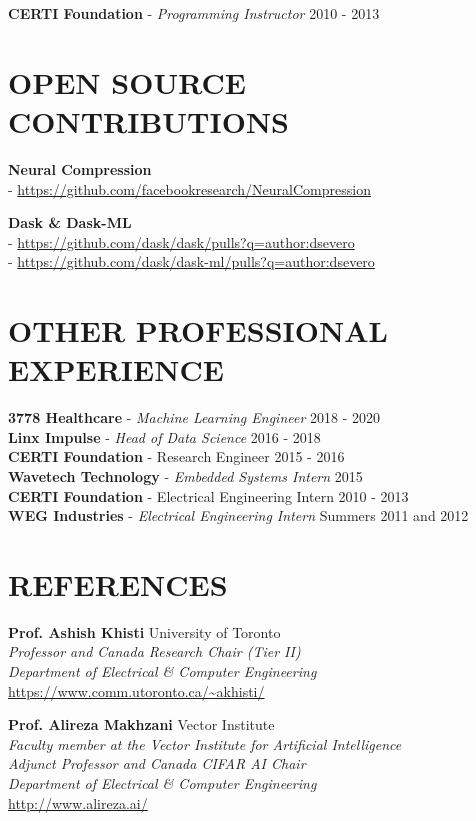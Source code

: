 \documentclass[margin, line]{res}
\begin{document}
\begin{resume}
\textbf{CERTI Foundation} - {\sl Programming Instructor} \hfill 2010 - 2013

\section{OPEN SOURCE CONTRIBUTIONS}
\textbf{Neural Compression}\\
- \url{https://github.com/facebookresearch/NeuralCompression}

\textbf{Dask \& Dask-ML}\\
- \url{https://github.com/dask/dask/pulls?q=author:dsevero}\\
- \url{https://github.com/dask/dask-ml/pulls?q=author:dsevero}

\section{OTHER PROFESSIONAL EXPERIENCE}
\textbf{3778 Healthcare} - {\sl Machine Learning Engineer} \hfill 2018 - 2020\\
\textbf{Linx Impulse} - {\sl Head of Data Science} \hfill 2016 - 2018\\
\textbf{CERTI Foundation} - Research Engineer \hfill 2015 - 2016\\
\textbf{Wavetech Technology} - {\sl Embedded Systems Intern} \hfill 2015\\
\textbf{CERTI Foundation} - Electrical Engineering Intern \hfill 2010 - 2013\\
\textbf{WEG Industries} - {\sl Electrical Engineering Intern} \hfill Summers 2011 and 2012

\section{REFERENCES}
\textbf{Prof. Ashish Khisti} \hfill University of Toronto\\
{\sl Professor and Canada Research Chair (Tier II)}\\
{\sl Department of Electrical \& Computer Engineering}\\
\url{https://www.comm.utoronto.ca/~akhisti/}

\textbf{Prof. Alireza Makhzani} \hfill Vector Institute\\
{\sl Faculty member at the Vector Institute for Artificial Intelligence}\\
{\sl Adjunct Professor and Canada CIFAR AI Chair}\\
{\sl Department of Electrical \& Computer Engineering}\\
\url{http://www.alireza.ai/}


\end{resume}
\end{document}
